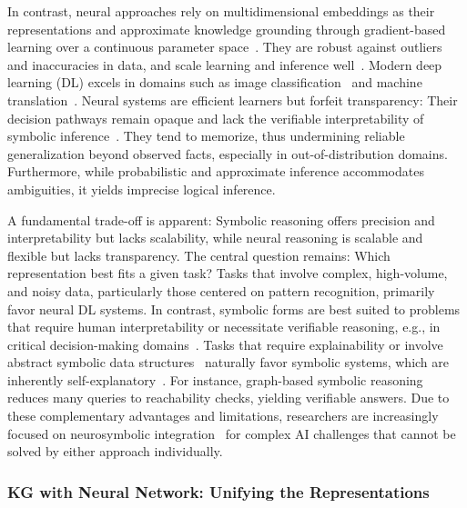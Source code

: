 \documentclass[10pt]{article}
\begin{document}
In contrast, neural approaches rely on multidimensional embeddings as their representations and approximate knowledge grounding through gradient-based learning over a continuous parameter space~\cite{LeCun2015}. They are robust against outliers and inaccuracies in data, and scale learning and inference well~\cite{10.1093/nsr/nwac035}. Modern deep learning (DL) excels in domains such as image classification~\cite{NIPS2012_Krizhevsky} and machine translation~\cite{bahdanau2016neuralmachinetranslation}. Neural systems are efficient learners but forfeit transparency: Their decision pathways remain opaque and lack the verifiable interpretability of symbolic inference~\cite{tran2025reasoningneurosymbolicai}. They tend to memorize, thus undermining reliable generalization beyond observed facts, especially in out-of-distribution domains. Furthermore, while probabilistic and approximate inference accommodates ambiguities, it yields imprecise logical inference. 

A fundamental trade-off is apparent: Symbolic reasoning offers precision and interpretability but lacks scalability, while neural reasoning is scalable and flexible but lacks transparency. The central question remains: Which representation best fits a given task? Tasks that involve complex, high-volume, and noisy data, particularly those centered on pattern recognition, primarily favor neural DL systems. In contrast, symbolic forms are best suited to problems that require human interpretability or necessitate verifiable reasoning, e.g., in critical decision-making domains~\cite{Rudin2019}. Tasks that require explainability or involve abstract symbolic data structures~\cite{WolframMathematica} naturally favor symbolic systems, which are inherently self-explanatory~\cite{10.1093/nsr/nwac035}. For instance, graph-based symbolic reasoning reduces many queries to reachability checks, yielding verifiable answers. Due to these complementary advantages and limitations, researchers are increasingly focused on neurosymbolic integration~\cite{tran2025reasoningneurosymbolicai} for complex AI challenges that cannot be solved by either approach individually.


\subsubsection{KG with Neural Network: Unifying the Representations}
\label{subsubsec:unifying}
\end{document}
